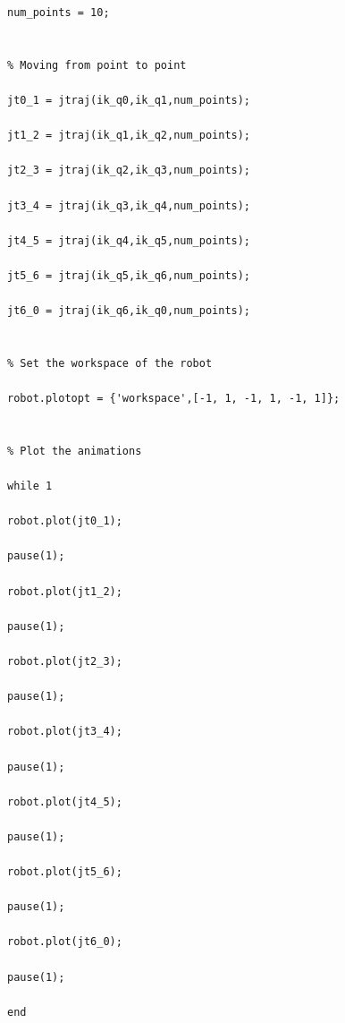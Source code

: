 \documentclass[11pt,a4paper]{report}
\begin{document}
\begin{lstlisting}
num_points = 10;


% Moving from point to point

jt0_1 = jtraj(ik_q0,ik_q1,num_points);

jt1_2 = jtraj(ik_q1,ik_q2,num_points);

jt2_3 = jtraj(ik_q2,ik_q3,num_points);

jt3_4 = jtraj(ik_q3,ik_q4,num_points);

jt4_5 = jtraj(ik_q4,ik_q5,num_points);

jt5_6 = jtraj(ik_q5,ik_q6,num_points);

jt6_0 = jtraj(ik_q6,ik_q0,num_points);


% Set the workspace of the robot

robot.plotopt = {'workspace',[-1, 1, -1, 1, -1, 1]};


% Plot the animations

while 1

robot.plot(jt0_1);

pause(1);

robot.plot(jt1_2);

pause(1);

robot.plot(jt2_3);

pause(1);

robot.plot(jt3_4);

pause(1);

robot.plot(jt4_5);

pause(1);

robot.plot(jt5_6);

pause(1);

robot.plot(jt6_0);

pause(1);

end
\end{lstlisting}
\end{document}
